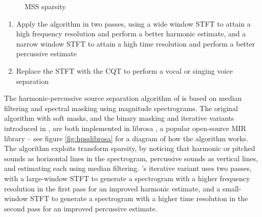 \documentclass[letter,12pt,notitlepage]{article}
\begin{document}
\begin{figure}[ht]
	\centering
	\caption{MSS sparsity}
	\label{fig:sepgood}
\end{figure}

\begin{enumerate}
	\item
		Apply the algorithm in two passes, using a wide window STFT to attain a high frequency resolution and perform a better harmonic estimate, and a narrow window STFT to attain a high time resolution and perform a better percussive estimate \cite{fitzgerald2, driedger}
	\item
		Replace the STFT with the CQT to perform a vocal or singing voice separation \cite{fitzgerald2}
\end{enumerate}

The harmonic-percussive source separation algorithm of \citet{fitzgerald1} is based on median filtering and spectral masking using magnitude spectrograms. The original algorithm with soft masks, and the binary masking and iterative variants introduced in \cite{driedger}, are both implemented in librosa \cite{librosa}, a popular open-source MIR library -- see figure \ref{fig:hpsslibrosa} for a diagram of how the algorithm works. The algorithm exploits transform sparsity, by noticing that harmonic or pitched sounds as horizontal lines in the spectrogram, percussive sounds as vertical lines, and estimating each using median filtering. \citet{driedger}'s iterative variant uses two passes, with a large-window STFT to generate a spectrogram with a higher frequency resolution in the first pass for an improved harmonic estimate, and a small-window STFT to generate a spectrogram with a higher time resolution in the second pass for an improved percussive estimate.
\end{document}
